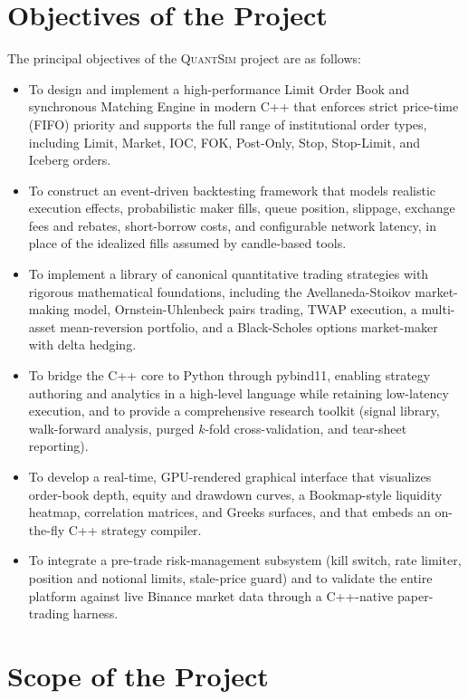 \documentclass[12pt,oneside,a4paper]{report}
\newcommand{\quantsim}{\textsc{QuantSim}}
\begin{document}
\section{Objectives of the Project}
\label{sec:objectives}

The principal objectives of the \quantsim{} project are as follows:

\begin{itemize}[leftmargin=2em]
    \item To design and implement a high-performance Limit Order Book and synchronous Matching Engine in modern C++ that enforces strict price-time (FIFO) priority and supports the full range of institutional order types, including Limit, Market, IOC, FOK, Post-Only, Stop, Stop-Limit, and Iceberg orders.
    \item To construct an event-driven backtesting framework that models realistic execution effects, probabilistic maker fills, queue position, slippage, exchange fees and rebates, short-borrow costs, and configurable network latency, in place of the idealized fills assumed by candle-based tools.
    \item To implement a library of canonical quantitative trading strategies with rigorous mathematical foundations, including the Avellaneda-Stoikov market-making model, Ornstein-Uhlenbeck pairs trading, TWAP execution, a multi-asset mean-reversion portfolio, and a Black-Scholes options market-maker with delta hedging.
    \item To bridge the C++ core to Python through pybind11, enabling strategy authoring and analytics in a high-level language while retaining low-latency execution, and to provide a comprehensive research toolkit (signal library, walk-forward analysis, purged $k$-fold cross-validation, and tear-sheet reporting).
    \item To develop a real-time, GPU-rendered graphical interface that visualizes order-book depth, equity and drawdown curves, a Bookmap-style liquidity heatmap, correlation matrices, and Greeks surfaces, and that embeds an on-the-fly C++ strategy compiler.
    \item To integrate a pre-trade risk-management subsystem (kill switch, rate limiter, position and notional limits, stale-price guard) and to validate the entire platform against live Binance market data through a C++-native paper-trading harness.
\end{itemize}

\section{Scope of the Project}
\label{sec:scope}
\end{document}
